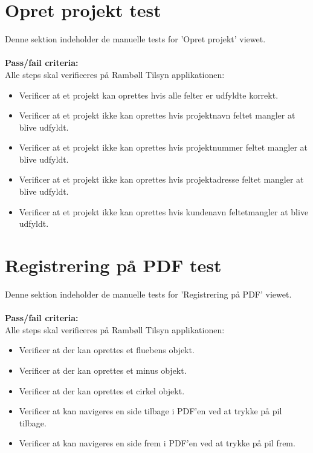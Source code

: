 \clearpage

\section{Opret projekt test}
Denne sektion indeholder de manuelle tests for 'Opret projekt' viewet. \\ \\
\textbf{Pass/fail criteria:} \\
Alle steps skal verificeres på Rambøll Tilsyn applikationen:
\begin{itemize}[-]
	\item Verificer at et projekt kan oprettes hvis alle felter er udfyldte korrekt.
	\item Verificer at et projekt ikke kan oprettes hvis projektnavn feltet mangler at blive udfyldt.
	\item Verificer at et projekt ikke kan oprettes hvis projektnummer feltet mangler at blive udfyldt.
	\item Verificer at et projekt ikke kan oprettes hvis projektadresse feltet mangler at blive udfyldt.
	\item Verificer at et projekt ikke kan oprettes hvis kundenavn feltetmangler at blive udfyldt. \\
\end{itemize}

\section{Registrering på PDF test}
Denne sektion indeholder de manuelle tests for 'Registrering på PDF' viewet. \\ \\
\textbf{Pass/fail criteria:} \\
Alle steps skal verificeres på Rambøll Tilsyn applikationen:
\begin{itemize}[-]
	\item Verificer at der kan oprettes et fluebens objekt.
	\item Verificer at der kan oprettes et minus objekt.
	\item Verificer at der kan oprettes et cirkel objekt.
	\item Verificer at kan navigeres en side tilbage i PDF'en ved at trykke på pil tilbage.
	\item Verificer at kan navigeres en side frem i PDF'en ved at trykke på pil frem. \\
\end{itemize}

